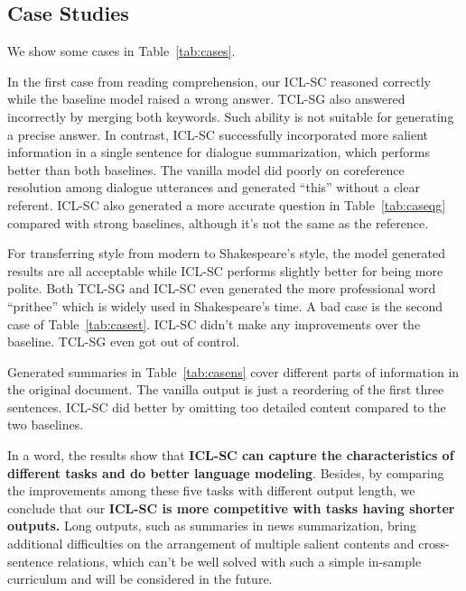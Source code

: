 \subsection{Case Studies}
\label{sec:casestudies}

We show some cases in Table~\ref{tab:cases}.%

In the first case from reading comprehension, our ICL-SC reasoned correctly while the baseline model raised a wrong answer. TCL-SG also answered incorrectly by merging both keywords. 
Such ability is not suitable for generating a precise answer.
In contrast, ICL-SC successfully incorporated more salient information in a single sentence for dialogue summarization, which performs better than both baselines. The vanilla model did poorly on coreference resolution among dialogue utterances and generated ``this'' without a clear referent. 
ICL-SC also generated a more accurate question in Table~\ref{tab:caseqg} compared with strong baselines, although it's not the same as the reference.

For transferring style from modern to Shakespeare's style, the model generated results are all acceptable while ICL-SC performs slightly better for being more polite. Both TCL-SG and ICL-SC even generated the more professional word ``prithee'' which is widely used in Shakespeare's time. A bad case is the second case of Table~\ref{tab:casest}. ICL-SC didn't make any improvements over the baseline. TCL-SG even got out of control.

Generated summaries in Table~\ref{tab:casens} cover different parts of information in the original document. The vanilla output is just a reordering of the first three sentences.
ICL-SC did better by omitting too detailed content compared to the two baselines. 

In a word, the results show that \textbf{ICL-SC can capture the characteristics of different tasks and do better language modeling}. Besides, by comparing the improvements among these five tasks with different output length, we conclude that our \textbf{ICL-SC is more competitive with tasks having shorter outputs.}
Long outputs, such as summaries in news summarization, bring additional difficulties on the arrangement of multiple salient contents and cross-sentence relations, which can't be well solved with such a simple in-sample curriculum and will be considered in the future.  %








